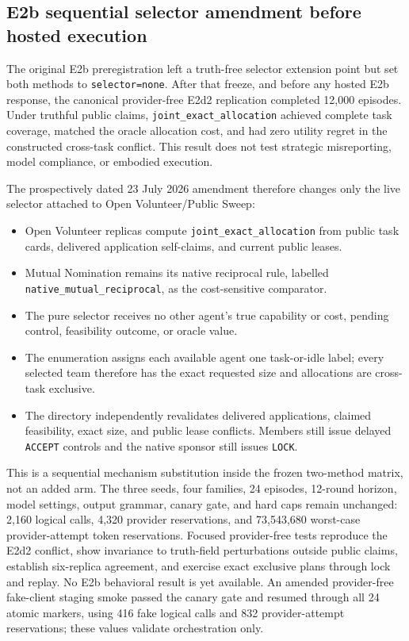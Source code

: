 \documentclass[11pt]{article}
\newcommand{\code}[1]{\texttt{#1}}
\begin{document}
\subsection{E2b sequential selector amendment before hosted execution}

The original E2b preregistration left a truth-free selector extension point but
set both methods to \code{selector=none}.  After that freeze, and before any
hosted E2b response, the canonical provider-free E2d2 replication completed
12,000 episodes.  Under truthful public claims,
\code{joint\_exact\_allocation} achieved complete task coverage, matched the
oracle allocation cost, and had zero utility regret in the constructed
cross-task conflict.  This result does not test strategic misreporting, model
compliance, or embodied execution.

The prospectively dated 23 July 2026 amendment therefore changes only the live
selector attached to Open Volunteer/Public Sweep:

\begin{itemize}
  \item Open Volunteer replicas compute
  \code{joint\_exact\_allocation} from public task cards, delivered
  application self-claims, and current public leases.
  \item Mutual Nomination remains its native reciprocal rule, labelled
  \code{native\_mutual\_reciprocal}, as the cost-sensitive comparator.
  \item The pure selector receives no other agent's true capability or cost,
  pending control, feasibility outcome, or oracle value.
  \item The enumeration assigns each available agent one task-or-idle label;
  every selected team therefore has the exact requested size and allocations
  are cross-task exclusive.
  \item The directory independently revalidates delivered applications,
  claimed feasibility, exact size, and public lease conflicts.  Members still
  issue delayed \code{ACCEPT} controls and the native sponsor still issues
  \code{LOCK}.
\end{itemize}

This is a sequential mechanism substitution inside the frozen two-method
matrix, not an added arm.  The three seeds, four families, 24 episodes,
12-round horizon, model settings, output grammar, canary gate, and hard caps
remain unchanged: 2,160 logical calls, 4,320 provider reservations, and
73,543,680 worst-case provider-attempt token reservations.  Focused
provider-free tests reproduce the E2d2 conflict, show invariance to truth-field
perturbations outside public claims, establish six-replica agreement, and
exercise exact exclusive plans through lock and replay.  No E2b behavioral
result is yet available.  An amended provider-free fake-client staging smoke
passed the canary gate and resumed through all 24 atomic markers, using 416
fake logical calls and 832 provider-attempt reservations; these values validate
orchestration only.
\end{document}
